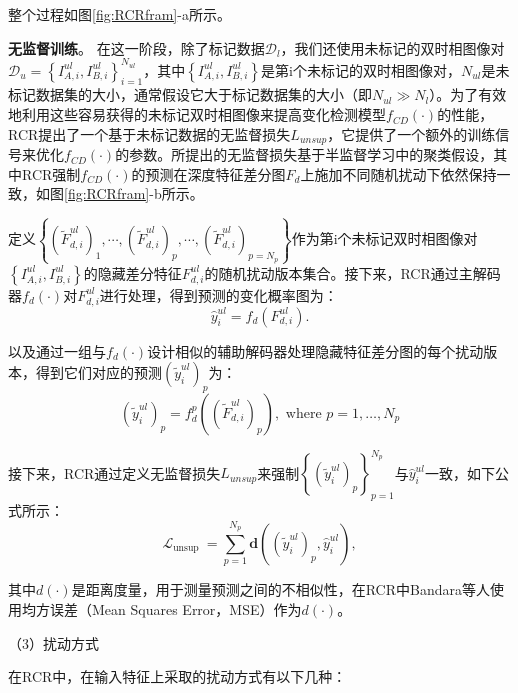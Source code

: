 \documentclass[lang=chs, degree=master, blindreview=false, adobe=false]{yanputhesis}
\begin{document}
整个过程如图\ref{fig:RCRfram}-a所示。

\textbf{无监督训练}。
在这一阶段，除了标记数据$\mathcal{D}_{l}$，我们还使用未标记的双时相图像对$\mathcal{D}_{u}=\left\{I_{A, i}^{ul}, I_{B, i}^{ul}\right\}_{i=1}^{N_{ul}}$，其中$\left\{I_{A, i}^{ul}, I_{B, i}^{ul}\right\}$是第i个未标记的双时相图像对，$N_{ul}$是未标记数据集的大小，通常假设它大于标记数据集的大小（即$N_{u l} \gg N_{l}$）。为了有效地利用这些容易获得的未标记双时相图像来提高变化检测模型$f_{C D}(\cdot)$的性能，RCR提出了一个基于未标记数据的无监督损失$L_{unsup}$，它提供了一个额外的训练信号来优化$f_{C D}(\cdot)$的参数。所提出的无监督损失基于半监督学习中的聚类假设，其中RCR强制$f_{C D}(\cdot)$的预测在深度特征差分图$F_d$上施加不同随机扰动下依然保持一致，如图\ref{fig:RCRfram}-b所示。

定义$\left\{\left(\widetilde{F}_{d, i}^{u l}\right)_{1}, \cdots,\left(\widetilde{F}_{d, i}^{u l}\right)_{p}, \cdots,\left(\widetilde{F}_{d, i}^{u l}\right)_{p=N_{p}}\right\}$作为第i个未标记双时相图像对$\left\{I_{A, i}^{ul}, I_{B, i}^{ul}\right\}$的隐藏差分特征$F_{d, i}^{u l}$的随机扰动版本集合。接下来，RCR通过主解码器$f_d(\cdot)$对$F_{d, i}^{u l}$进行处理，得到预测的变化概率图为：
\begin{equation}
  \label{eq:RCRpredict}
  \hat{y}_{i}^{u l}=f_{d}\left(F_{d, i}^{u l}\right) .
\end{equation}

以及通过一组与$f_d(\cdot)$设计相似的辅助解码器处理隐藏特征差分图的每个扰动版本，得到它们对应的预测$\left(\widetilde{y}_{i}^{u l}\right)_{p}$为：
\begin{equation}
  \label{eq:RCRauxpredict}
  \left(\widetilde{y}_{i}^{u l}\right)_{p}=f_{d}^{p}\left(\left(\widetilde{F}_{d, i}^{u l}\right)_{p}\right), \text { where } p=1, \ldots, N_{p}
\end{equation}

接下来，RCR通过定义无监督损失$L_{unsup}$来强制$\left\{\left(\widetilde{y}_{i}^{u l}\right)_{p}\right\}_{p=1}^{N_{p}}$与$\hat{y}_{i}^{u l}$一致，如下公式所示：
\begin{equation}
  \label{eq:RCRLossu}
  \mathcal{L}_{\text {unsup }}=\sum_{p=1}^{N_{p}} \mathbf{d}\left(\left(\widetilde{y}_{i}^{u l}\right)_{p}, \hat{y}_{i}^{u l}\right),
\end{equation}

其中$d(\cdot)$是距离度量，用于测量预测之间的不相似性，在RCR中Bandara等人使用均方误差（Mean Squares Error，MSE）作为$d(\cdot)$。

（3）扰动方式

在RCR中，在输入特征上采取的扰动方式有以下几种：
\end{document}
